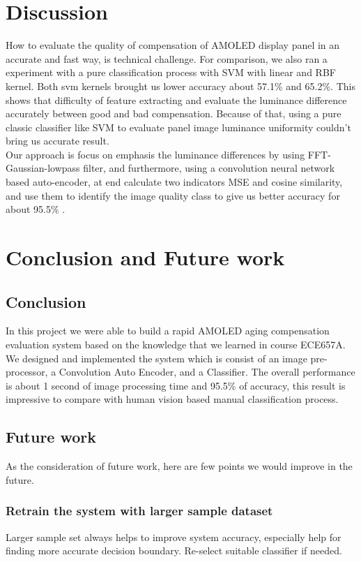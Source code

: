 \documentclass[runningheads]{llncs}
\begin{document}
\section{Discussion}
How to evaluate the quality of compensation of AMOLED display panel in an accurate and fast way, is technical challenge. For comparison, we also ran a experiment with a pure classification process with SVM with linear and RBF kernel. Both svm kernels brought us lower accuracy about 57.1\% and 65.2\%. This shows that difficulty of feature extracting and evaluate the luminance difference accurately between good and bad compensation. Because of that, using a pure classic classifier like SVM to evaluate panel image luminance uniformity couldn't bring us accurate result.\\
Our approach is focus on emphasis the luminance differences by using FFT-Gaussian-lowpass filter, and furthermore, using a convolution neural network based auto-encoder, at end calculate two indicators MSE and cosine similarity, and use them to identify the image quality class to give us better accuracy for about 95.5\% .
\section{Conclusion and Future work}
\subsection{Conclusion}
In this project we were able to build a rapid AMOLED aging compensation evaluation system based on the knowledge that we learned in course ECE657A. We designed and implemented the system which is consist of an image pre-processor, a Convolution Auto Encoder, and a Classifier. The overall performance is about 1 second of image processing time and 95.5\% of accuracy, this result is impressive to compare with human vision based manual classification process.
\subsection{Future work}
As the consideration of future work, here are few points we would improve in the future.
\subsubsection{Retrain the system with larger sample dataset}
Larger sample set always helps to improve system accuracy, especially help for finding more accurate decision boundary. Re-select suitable classifier if needed.
\end{document}
